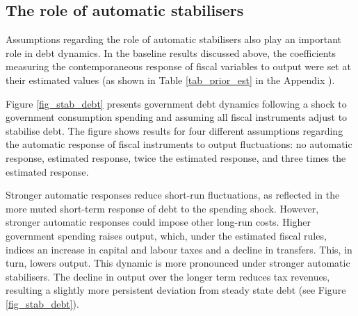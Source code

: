\documentclass[a4paper,11pt]{article}
\numberwithin{equation}{section}
\begin{document}
	\begin{minipage}{\linewidth}
		
	\end{minipage}
	
	\subsection{The role of automatic stabilisers}
	
	Assumptions regarding the role of automatic stabilisers also play an important role in debt dynamics. In the baseline results discussed above, the coefficients measuring the contemporaneous response of fiscal variables to output were set at their estimated values (as shown in Table \ref{tab_prior_est} in the Appendix ). 

	Figure \ref{fig_stab_debt} presents government debt dynamics following a shock to government consumption spending and assuming all fiscal instruments adjust to stabilise debt. The figure shows results for four different assumptions regarding the automatic response of fiscal instruments to output fluctuations: no automatic response, estimated response, twice the estimated response, and three times the estimated response.
	
	Stronger automatic responses reduce short-run fluctuations, as reflected in the more muted short-term response of debt to the spending shock. However, stronger automatic responses could impose other long-run costs. Higher government spending raises output, which, under the estimated fiscal rules, indices an increase in capital and labour taxes and a decline in transfers. This, in turn, lowers output. This dynamic is more pronounced under stronger automatic stabilisers. The decline in output over the longer term reduces tax revenues, resulting a slightly more persistent deviation from steady state debt (see Figure \ref{fig_stab_debt}).   
	
\end{document}
